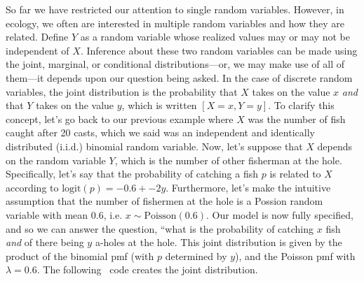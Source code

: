 So far we have restricted our attention to single random variables.
However, in ecology, we often are interested in multiple random
variables and how they are related. Define $Y$ as a random variable
whose realized values may or may not be independent of $X$. Inference
about these two random variables can be made using the joint,
marginal, or conditional distributions---or, we may make use of all of
them---it depends upon our question being asked. In the case of
discrete random variables, the joint
distribution is the probability that $X$ takes on the value $x$
\textit{and} that $Y$ takes on the value $y$, which is written
$[X=x,Y=y]$. To clarify this concept, let's go back to our previous
example where $X$ was the number of fish caught after 20 casts, which
we said was an independent and identically distributed (i.i.d.)
binomial random variable. Now,
let's suppose that $X$ depends on the random variable $Y$, which is
the number of other fisherman at the hole. Specifically, let's say
that the probability of catching a fish $p$ is related to $X$
according to $\text{logit}(p) = -0.6 + -2y$. Furthermore, let's
make the intuitive assumption that the number of fishermen at the hole
is a Possion random variable with mean $0.6$, i.e. $x \sim
\text{Poisson}(0.6)$. Our model is now fully specified, and so we can
answer the question, ``what is the probability of catching $x$ fish
\textit{and} of there being $y$ a-holes at the hole. This joint
distribution is given by the product of the binomial pmf (with $p$
determined by $y$), and the Poisson pmf with $\lambda=0.6$. The
following \R~code creates the joint distribution.
